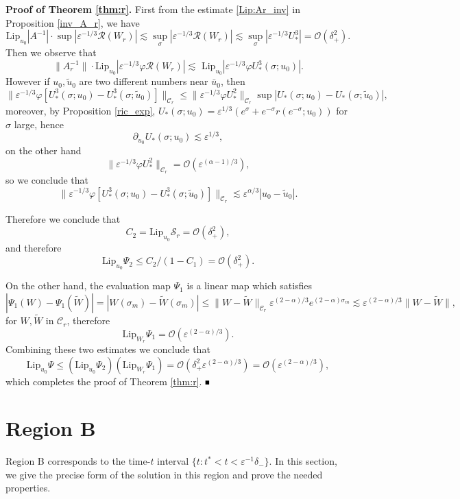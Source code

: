 \documentclass[letterpaper,11pt]{article}
\newcommand{\rmO}{\mathcal{O}}
\newcommand{\eps}{\varepsilon}
\newcommand{\lar}{ \lesssim }
\numberwithin{equation}{section}
\theoremstyle{plain}
\newenvironment{Proof}[1][.]%
 {\begin{trivlist}\item[]\textbf{Proof#1 }}%
 {\hspace*{\fill}$\rule{0.3\baselineskip}{0.35\baselineskip}$\end{trivlist}}
\begin{document}
\begin{Proof}[ of Theorem \ref{thm:r}.]
First from the estimate \eqref{Lip:Ar_inv} in Proposition \ref{inv_A_r}, we have
\[
\text{Lip}_{u_0} |A^{-1}| \cdot \sup|\eps^{-1/3}\mathcal{R}(W_r)| \lar \sup_{\sigma}|\eps^{-1/3}\mathcal{R}(W_r)| \lar \sup_{\sigma}|\eps^{-1/3}U_*^3| =  \rmO(\delta_+^2).
\]
Then we observe that
\[
\|A_r^{-1}\| \cdot \text{Lip}_{u_0} |\eps^{-1/3}\varphi\mathcal{R}(W_r)| \lar \text{ Lip}_{u_0} |\eps^{-1/3}\varphi U_*^3(\sigma;u_0) |.
\]
However if $u_0, \tilde{u}_0$ are two different numbers near $\bar{u}_0$, then
\[
\|\eps^{-1/3}\varphi [U_*^3(\sigma;u_0)-U_*^3(\sigma;\tilde{u}_0)] \|_{\mathcal{C}_r} \le \|\eps^{-1/3}\varphi U_*^2 \|_{\mathcal{C}_r} \sup|U_*(\sigma;u_0)-U_*(\sigma;\tilde{u}_0)|,
\] 
moreover, by Proposition \ref{ric_exp},
$U_*(\sigma;u_0)= \eps^{1/3}(e^\sigma + e^{-\sigma} r(e^{-\sigma}; u_0))$ for $\sigma$ large, hence 
\[
\partial_{u_0} U_*(\sigma;u_0) \lar \eps^{1/3},
\]
on the other hand
\[
\|\eps^{-1/3}\varphi U_*^2 \|_{\mathcal{C}_r}  = \rmO(\eps^{(\alpha-1)/3}),
\]
so we conclude that
\[
\|\eps^{-1/3}\varphi [U_*^3(\sigma;u_0)-U_*^3(\sigma;\tilde{u}_0)] \|_{\mathcal{C}_r} \lar\eps^{\alpha/3}|u_0 - \tilde{u}_0|.
\]

Therefore we conclude that
\[
C_2 = \text{Lip}_{u_0} \mathcal{S}_r = \rmO(\delta_+^2),
\]
and therefore
\[
\text{Lip}_{u_0} \Psi_2 \le C_2/(1-C_1)= \rmO(\delta_+^2).
\]

On the other hand, the evaluation map $\Psi_1$ is a linear map which satisfies
\[
|\Psi_1(W)-\Psi_1(\widetilde{W})| = |W(\sigma_m) -\widetilde{W}(\sigma_m) | \le\|W - \widetilde{W}\|_{\mathcal{C}_r}\eps^{(2-\alpha)/3} e^{(2-\alpha)\sigma_m} \lar \eps^{(2-\alpha)/3}\|W-\widetilde{W}\|,
\]
for $W,\widetilde{W}$ in $\mathcal{C}_r$, therefore
\[
\text{Lip}_{W_r} \Psi_1 = \rmO(\eps^{(2-\alpha)/3}).
\]
Combining these two estimates we conclude that 
\[
\text{Lip}_{u_0} \Psi \le \left( \text{Lip}_{u_0} \Psi_2 \right) \left( \text{Lip}_{W_r} \Psi_1 \right) = \rmO(\delta_+^2\eps^{(2-\alpha)/3})=\rmO(\eps^{(2-\alpha)/3}),
\] 
which completes the proof of Theorem \ref{thm:r}.
\end{Proof}

\section{Region B}\label{sec_B}

Region B corresponds to the time-$t$ interval $ \{t: t^*< t< \eps^{-1}\delta_-\}$. In this section, we give the precise form of the solution in this region and prove the needed properties.
\end{document}
